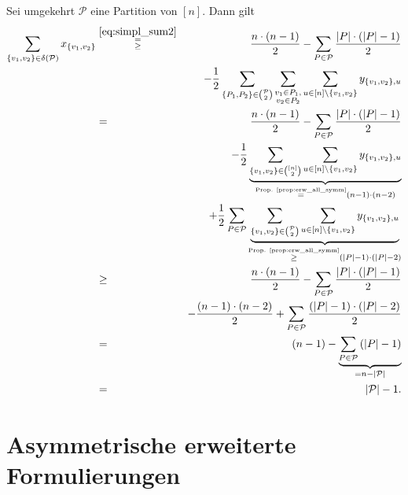 \documentclass[10p,a4paper,BCOR = 12mm, DIV=15]{scrbook}
\begin{document}
\begin{bew}
Sei umgekehrt $\mathcal{P}$ eine Partition von $\left[n\right]$. Dann gilt
\begin{eqnarray*}
\sum_{\left\{v_1, v_2\right\} \in \delta\left(\mathcal{P}\right)} x_{\left\{v_1, v_2\right\}} & \stackrel{\eqref{eq:simpl_sum2}}{\substack{= \\ \geq}} & \frac{n \cdot \left(n - 1\right)}{2} - \sum_{P \in \mathcal{P}} \frac{\left|P\right| \cdot \left(\left|P\right| - 1\right)}{2} \\
& &  - \frac{1}{2} \sum_{\left\{P_1, P_2\right\} \in {\mathcal{P} \choose 2}} \sum_{\substack{v_1 \in P_1, \\
v_2 \in P_2}} \sum_{u \in \left[n\right] \backslash \left\{v_1, v_2\right\}} y_{\left\{v_1, v_2\right\}, u} \\
& = & \frac{n \cdot \left(n - 1\right)}{2} - \sum_{P \in \mathcal{P}} \frac{\left|P\right| \cdot \left(\left|P\right| - 1\right)}{2} \\
& &  - \frac{1}{2} \underbrace{\sum_{\left\{v_1, v_2\right\} \in {\left[n\right] \choose 2}} \sum_{u \in \left[n\right] \backslash \left\{v_1, v_2\right\}} y_{\left\{v_1, v_2\right\}, u}}_{\stackrel{\textnormal{Prop. \ref{prop:erw_all_symm}}}{=} \left(n - 1\right) \cdot \left(n - 2\right)} \\
& &  + \frac{1}{2} \sum_{P \in \mathcal{P}} \underbrace{\sum_{\left\{v_1, v_2\right\} \in {\mathcal{P} \choose 2}} \sum_{u \in \left[n\right] \backslash \left\{v_1, v_2\right\}} y_{\left\{v_1, v_2\right\}, u}}_{\stackrel{\textnormal{Prop. \ref{prop:erw_all_symm}}}{\geq} \left(\left|P\right| - 1\right) \cdot \left(\left|P\right| - 2\right)} \\
& \geq & \frac{n \cdot \left(n - 1\right)}{2} - \sum_{P \in \mathcal{P}} \frac{\left|P\right| \cdot \left(\left|P\right| - 1\right)}{2}  \\
& & - \frac{\left(n - 1\right) \cdot \left(n - 2\right)}{2} + \sum_{P \in \mathcal{P}} \frac{\left(\left|P\right| - 1\right) \cdot \left(\left|P\right| - 2\right)}{2} \\
& = & \left(n - 1\right) - \underbrace{\sum_{P \in \mathcal{P}} \left(\left|P\right| - 1\right)}_{= n - \left|\mathcal{P}\right|} \\
& = & \left|\mathcal{P}\right| - 1.
\end{eqnarray*}
\end{bew}

\section{Asymmetrische erweiterte Formulierungen}
\end{document}
